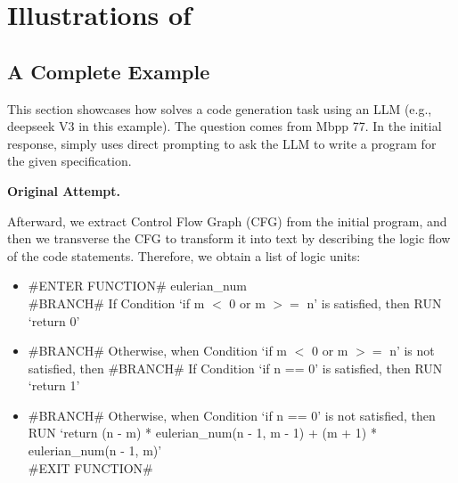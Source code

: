 \appendix
\onecolumn
\section{Illustrations of \tool}
\subsection{A Complete Example}
This section showcases how \tool solves a code generation task using an LLM (e.g., deepseek V3 in this example). The question comes from Mbpp 77.
In the initial response, \tool simply uses direct prompting to ask the LLM to write a program for the given specification.

\textbf{Original Attempt.} 


Afterward, we extract Control Flow Graph (CFG) from the initial program, and then we transverse the CFG to transform it into text by describing the logic flow of the code statements. Therefore, we obtain a list of logic units:
\begin{itemize}
    \item   \#ENTER FUNCTION\# eulerian\_num \\
    \#BRANCH\# If Condition `if m $<$ 0 or m $>=$ n' is satisfied, then RUN `return 0'

    \item \#BRANCH\# Otherwise, when Condition `if m $<$ 0 or m $>=$ n' is not satisfied, then \#BRANCH\# If Condition `if n == 0' is satisfied, then RUN `return 1'
    
    \item \#BRANCH\# Otherwise, when Condition `if n == 0' is not satisfied, then RUN `return (n - m) * eulerian\_num(n - 1, m - 1) + (m + 1) * eulerian\_num(n - 1, m)' \\ \#EXIT FUNCTION\#
\end{itemize}

